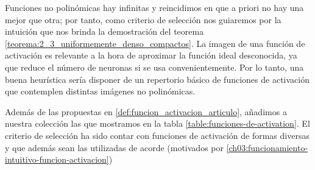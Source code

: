 Funciones no polinómicas hay infinitas y reincidimos en que a priori no hay una mejor que otra; por tanto, como criterio de selección nos guiaremos por la intuición que nos brinda la demostración del teorema \ref{teorema:2_3_uniformemente_denso_compactos}.
  La imagen de una función de activación es relevante a la hora de aproximar la función ideal desconocida, ya que reduce el número 
  de neuronas si se usa convenientemente.  
Por lo tanto, una buena heurística sería disponer de un repertorio básico de funciones de activación que contemplen distintas imágenes no polinómicas.


Además de las propuestas en \ref{def:funcion_activacion_articulo}, 
añadimos a nuestra colección las que mostramos en la tabla \ref{table:funciones-de-activation}. El criterio de selección ha sido contar con funciones de activación de formas diversas y que además sean las utilizadas de acorde (motivados por \ref{ch03:funcionamiento-intuitivo-funcion-activacion}) 

\pagebreak

